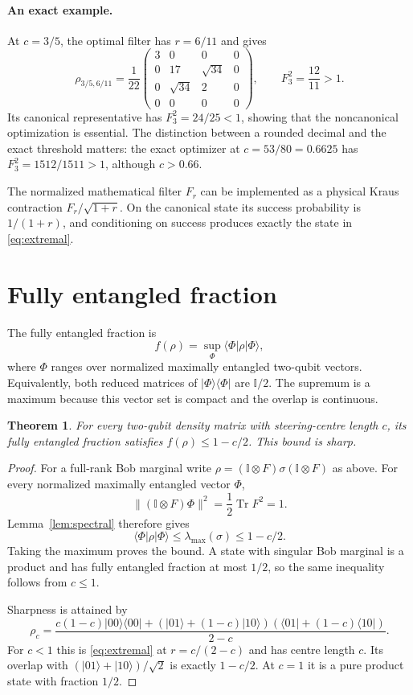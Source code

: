 \documentclass[11pt]{article}
\newtheorem{theorem}{Theorem}
\newcommand{\tr}{\operatorname{Tr}}
\newcommand{\Id}{\mathbb{I}}
\newcommand{\ket}[1]{\lvert #1\rangle}
\newcommand{\bra}[1]{\langle #1\rvert}
\newcommand{\norm}[1]{\lVert #1\rVert}
\begin{document}
\paragraph{An exact example.}
At $c=3/5$, the optimal filter has $r=6/11$ and gives
\[
 \rho_{3/5,6/11}=\frac1{22}
 \begin{pmatrix}
 3&0&0&0\\
 0&17&\sqrt{34}&0\\
 0&\sqrt{34}&2&0\\
 0&0&0&0
 \end{pmatrix},\qquad F_3^2=\frac{12}{11}>1.
\]
Its canonical representative has $F_3^2=24/25<1$, showing that the noncanonical optimization is essential. The distinction between a rounded decimal and the exact threshold matters: the exact optimizer at $c=53/80=0.6625$ has $F_3^2=1512/1511>1$, although $c>0.66$.

The normalized mathematical filter $F_r$ can be implemented as a physical Kraus contraction $F_r/\sqrt{1+r}$. On the canonical state its success probability is $1/(1+r)$, and conditioning on success produces exactly the state in \eqref{eq:extremal}.

\section{Fully entangled fraction}
The fully entangled fraction is
\[
 f(\rho)=\sup_{\Phi}\bra\Phi\rho\ket\Phi,
\]
where $\Phi$ ranges over normalized maximally entangled two-qubit vectors. Equivalently, both reduced matrices of $\ket\Phi\bra\Phi$ are $\Id/2$. The supremum is a maximum because this vector set is compact and the overlap is continuous.
\begin{theorem}\label{thm:fef}
For every two-qubit density matrix with steering-centre length $c$, its fully entangled fraction satisfies $f(\rho)\leq1-c/2$. This bound is sharp.
\end{theorem}
\begin{proof}
For a full-rank Bob marginal write $\rho=(\Id\otimes F)\sigma(\Id\otimes F)$ as above. For every normalized maximally entangled vector $\Phi$,
\[
 \norm{(\Id\otimes F)\Phi}^2=\frac12\tr F^2=1.
\]
Lemma~\ref{lem:spectral} therefore gives
\[
 \bra\Phi\rho\ket\Phi
 \leq\lambda_{\max}(\sigma)\leq1-c/2.
\]
Taking the maximum proves the bound. A state with singular Bob marginal is a product and has fully entangled fraction at most $1/2$, so the same inequality follows from $c\leq1$.

Sharpness is attained by
\[
 \rho_c=\frac{c(1-c)\ket{00}\bra{00}
 +(\ket{01}+(1-c)\ket{10})(\bra{01}+(1-c)\bra{10})}{2-c}.
\]
For $c<1$ this is \eqref{eq:extremal} at $r=c/(2-c)$ and has centre length $c$. Its overlap with $(\ket{01}+\ket{10})/\sqrt2$ is exactly $1-c/2$. At $c=1$ it is a pure product state with fraction $1/2$.
\end{proof}
\end{document}
